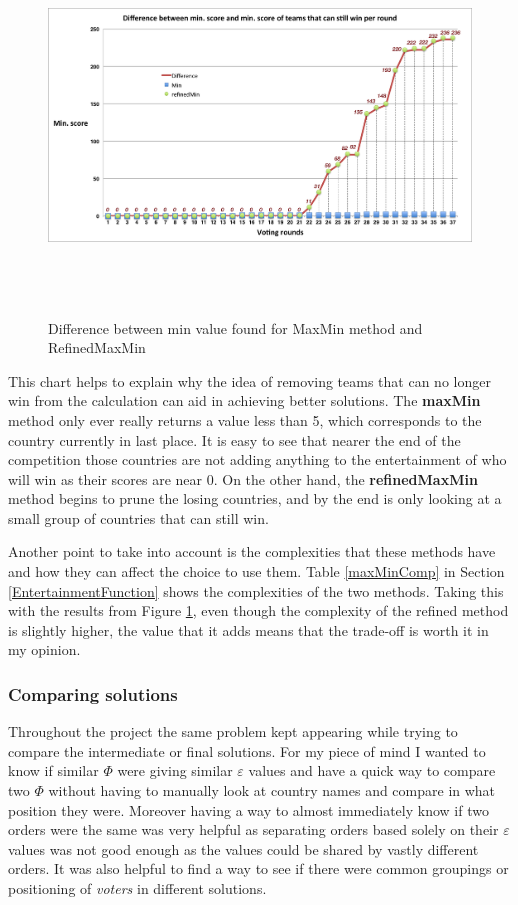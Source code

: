 \documentclass[12pt]{report}
\begin{document}
\begin{figure}[H]
\centering
\includegraphics[width=18cm, height=10cm]{../code/misc/difference_MinvsRefinedMin}
\caption{Difference between min value found for MaxMin method and RefinedMaxMin}
\label{f_maxminDif}
\end{figure}

This chart helps to explain why the idea of removing teams that can no longer win from the calculation can aid in achieving better solutions. The \textbf{maxMin} method only ever really returns a value less than 5, which corresponds to the country currently in last place. It is easy to see that nearer the end of the competition those countries are not adding anything to the entertainment of who will win as their scores are near 0. On the other hand, the \textbf{refinedMaxMin} method begins to prune the losing countries, and by the end is only looking at a small group of countries that can still win.

Another point to take into account is the complexities that these methods have and how they can affect the choice to use them. Table \ref{maxMinComp} in Section \ref{EntertainmentFunction} shows the complexities of the two methods. Taking this with the results from Figure \ref{f_maxminDif}, even though the complexity of the refined method is slightly higher, the value that it adds means that the trade-off is worth it in my opinion.

\subsubsection{Comparing solutions}
Throughout the project the same problem kept appearing while trying to compare the intermediate or final solutions. For my piece of mind I wanted to know if similar $\Phi$ were giving similar $\varepsilon$ values and have a quick way to compare two $\Phi$ without having to manually look at country names and compare in what position they were. Moreover having a way to almost immediately know if two orders were the same was very helpful as separating orders based solely on their $\varepsilon$ values was not good enough as the values could be shared by vastly different orders. It was also helpful to find a way to see if there were common groupings or positioning of \textit{voters} in different solutions.
\end{document}
